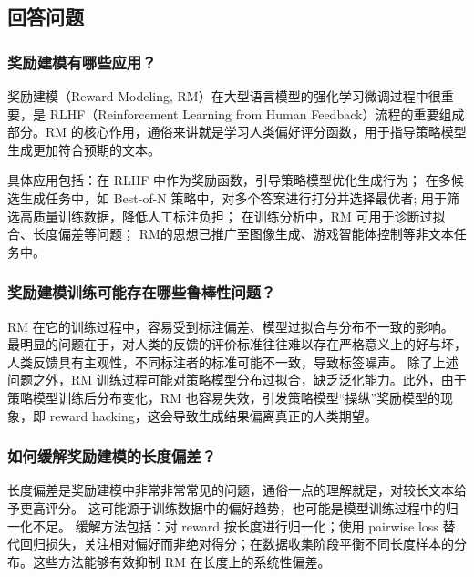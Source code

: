 \documentclass{article}
\begin{document}
\subsection{回答问题}
\subsubsection{奖励建模有哪些应用？}
奖励建模（Reward Modeling, RM）在大型语言模型的强化学习微调过程中很重要，是 RLHF（Reinforcement Learning from Human Feedback）流程的重要组成部分\cite{ouyang2022training}。RM 的核心作用，通俗来讲就是学习人类偏好评分函数，用于指导策略模型生成更加符合预期的文本。

具体应用包括：在 RLHF 中作为奖励函数，引导策略模型优化生成行为；
在多候选生成任务中，如 Best-of-N 策略中，对多个答案进行打分并选择最优者\cite{ziegler2019fine}; 
用于筛选高质量训练数据，降低人工标注负担；
在训练分析中，RM 可用于诊断过拟合、长度偏差等问题；
RM的思想已推广至图像生成、游戏智能体控制等非文本任务中\cite{bai2022training}。

\vspace{0.5em}

\subsubsection{奖励建模训练可能存在哪些鲁棒性问题？}
RM 在它的训练过程中，容易受到标注偏差、模型过拟合与分布不一致的影响。
最明显的问题在于，对人类的反馈的评价标准往往难以存在严格意义上的好与坏，人类反馈具有主观性，不同标注者的标准可能不一致，导致标签噪声。
除了上述问题之外，RM 训练过程可能对策略模型分布过拟合，缺乏泛化能力\cite{ouyang2022training}。此外，由于策略模型训练后分布变化，RM 也容易失效，引发策略模型“操纵”奖励模型的现象，即 reward hacking\cite{bai2022training}，这会导致生成结果偏离真正的人类期望。

\vspace{0.5em}

\subsubsection{如何缓解奖励建模的长度偏差？}
长度偏差是奖励建模中非常非常常见的问题，通俗一点的理解就是，对较长文本给予更高评分。
这可能源于训练数据中的偏好趋势，也可能是模型训练过程中的归一化不足。
缓解方法包括：对 reward 按长度进行归一化；使用 pairwise loss 替代回归损失，关注相对偏好而非绝对得分\cite{ziegler2019fine}；在数据收集阶段平衡不同长度样本的分布\cite{anthropic2023claude}。这些方法能够有效抑制 RM 在长度上的系统性偏差。

\vspace{0.5em}
\end{document}
